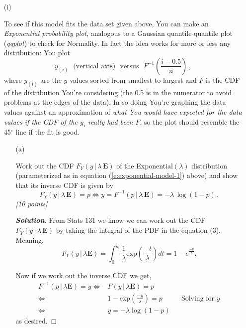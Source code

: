 \documentclass[12pt]{article}
\newcommand{\given}{\, | \,}
\newenvironment{solution}{\begin{proof}[\textbf{\textit{Solution}}] }{\end{proof}}
\begin{document}
\begin{itemize}
\begin{itemize}

\item[(i)]

To see if this model fits the data set given above, You can make an \textit{Exponential probability plot}, analogous to a Gaussian quantile-quantile plot (\textit{qqplot}) to check for Normality. In fact the idea works for more or less any distribution: You plot 
\begin{equation} \label{e:probability-plot-1}
y_{ ( i ) } \ \ \ \mbox{(vertical axis)} \ \ \ \mbox{versus} \ \ \ F^{ -1 } \left( \frac{ i - 0.5 }{ n }
\right) \, ,
\end{equation}
where $y_{ ( i ) }$ are the $y$ values sorted from smallest to largest and $F$ is the CDF of the distribution You're considering (the 0.5 is in the numerator to avoid problems at the edges of the data). In so doing You're graphing the data values against an approximation of \textit{what You would have expected for the data values if the CDF of the $y_i$ really had been $F$}, so the plot should resemble the 45$^\circ$ line if the fit is good.  

\begin{itemize}

\item[(a)] 

Work out the CDF $F_Y ( y \given \lambda \, \bm{ E } )$ of the Exponential$( \lambda )$ distribution (parameterized as in equation (\ref{e:exponential-model-1}) above)
and show that its inverse CDF is given by
\begin{equation} \label{e:probability-plot-2}
F_Y ( y \given \lambda \, \bm{ E } ) = p \iff y = F^{ -1 }( p \given \lambda \, \bm{ E } ) = - \lambda \, \log ( 1 - p ) \, .
\end{equation}
\textit{[10 points]} 

\begin{tcolorbox}[breakable]
    \begin{solution}
        From Stats 131 we know we can work out the CDF $F_Y ( y \given \lambda \, \bm{ E } )$ by taking the integral of the PDF in the equation (3). Meaning,
        \[F_Y(y \given \lambda \bm{E}) = \int_0^{y_i} \frac{1}{\lambda}\text{exp}(\frac{-t}{\lambda})dt = 1-e^{\frac{-y}{\lambda}}. \]

        Now if we work out the inverse CDF we get,
        \begin{align*}
            F^{-1}(p \given \lambda \bm{E}) = y \Longleftrightarrow& F(y \given \lambda \bm{E} ) = p \\
             \Longleftrightarrow& 1- \text{exp}(\frac{-y}{\lambda})=p && \text{Solving for $y$} \\
             \Longleftrightarrow& y = -\lambda \log(1-p)
        \end{align*}
        as desired. 
    \end{solution}
\end{tcolorbox}


\end{itemize}
\end{itemize}
\end{itemize}
\end{document}
